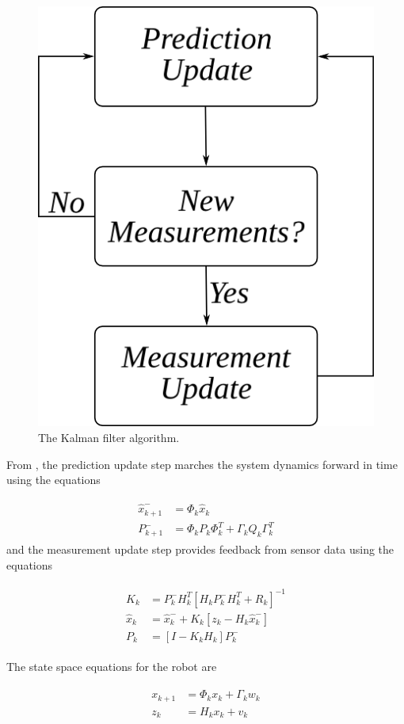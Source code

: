 \begin{figure}[ht!]
	\centering
	\includegraphics[width=.4\textwidth]{images/kf}
	\caption{The Kalman filter algorithm.}
	\label{fig:kf}
\end{figure}

From \cite{Kelly_1994_338}, \cite{Simon06OptimalEstimation} the prediction update step marches the system dynamics forward in time using the equations

\begin{align}
\label{eq:predictionupdate}
\begin{split}
\hat{x}_{k+1}^- &= \Phi_k\hat{x}_k \\
P_{k+1}^- &= \Phi_kP_k\Phi_k^T + \Gamma_kQ_k\Gamma_k^T
\end{split}
\end{align}
and the measurement update step provides feedback from sensor data using the equations

\begin{align}
\label{eq:measurementupdate}
\begin{split}
K_k &= P_k^-H_k^T\left[H_kP_k^-H_k^T + R_k\right]^{-1} \\
\hat{x}_k &= \hat{x}_k^- + K_k\left[z_k - H_k\hat{x}_k^-\right] \\
P_k &= \left[I - K_kH_k\right]P_k^-
\end{split}
\end{align}

The state space equations for the robot are

\begin{align}
\label{eq:discretess}
\begin{split}
x_{k+1} &= \Phi_kx_k + \Gamma_kw_k \\
z_k &= H_kx_k + v_k
\end{split}
\end{align}

